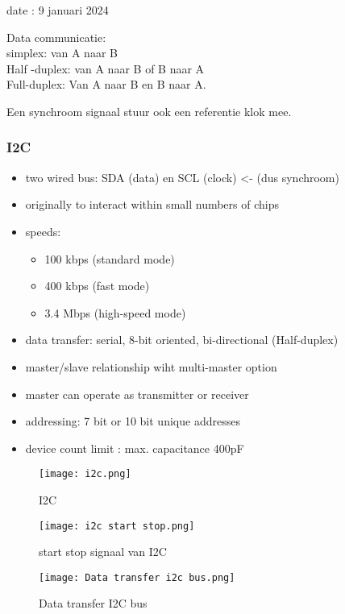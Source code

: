 date : 9 januari 2024

Data communicatie:\\
simplex: van A naar B\\
Half -duplex: van A naar B of B naar A\\
Full-duplex: Van A naar B en B naar A.

Een synchroom signaal stuur ook een referentie klok mee.

\subsubsection{I2C}
\begin{itemize}
    \item two wired bus: SDA (data) en SCL (clock) <- (dus synchroom)
    \item originally to interact within small numbers of chips
    \item speeds:
    \begin{itemize}
        \item 100 kbps (standard mode)
        \item 400 kbps (fast mode)
        \item 3.4 Mbps (high-speed mode)
    \end{itemize}
    \item data transfer: serial, 8-bit oriented, bi-directional (Half-duplex)
    \item master/slave relationship wiht multi-master option
    \item master can operate as transmitter or receiver
    \item addressing: 7 bit or 10 bit unique addresses
    \item device count limit : max. capacitance 400pF
\end{itemize}

\begin{figure}[H]
    \centering
    \texttt{[image: i2c.png]}
    \caption*{ I2C}
    \end{figure}

\begin{figure}[H]
    \centering
    \texttt{[image: i2c start stop.png]}
    \caption*{start stop signaal van I2C}
    \end{figure}

\begin{figure}[H]
    \centering
    \texttt{[image: Data transfer i2c bus.png]}
    \caption*{Data transfer I2C bus}
    \end{figure}

